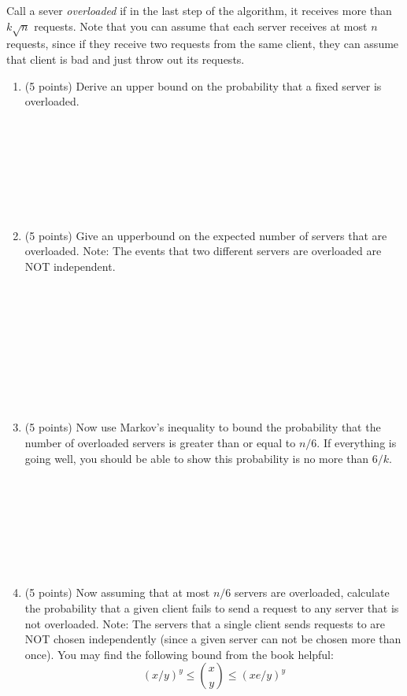 \documentclass[11pt]{article}
\begin{document}
\begin{enumerate}
Call a sever \emph{overloaded} if in the last step of the algorithm, it receives more than $k\sqrt{n}$ requests.  Note that you can assume that each server receives at most $n$ requests, since if they receive two requests from the same client, they can assume that client is bad and just throw out its requests.  
\begin{enumerate}

\item (5 points) Derive an upper bound on the probability that a fixed server is overloaded.
 \\ \ \\ \ \\ \ \\ \ \\ \ \\ \ \\ \ \\
  
\pagebreak 
  
\item (5 points) Give an upperbound on the expected number of servers that are overloaded.  Note: The events that two different servers are overloaded are NOT independent.

  \ \\ \ \\ \ \\ \ \\ \ \\ \ \\ \ \\ \ \\

\item (5 points) Now use Markov's inequality to bound the probability that the number of overloaded servers is greater than or equal to $n/6$.  If everything is going well, you should be able to show this probability is no more than $6/k$.
\ \\ \ \\ \ \\ \ \\ \ \\ \ \\ \ \\ \ \\


\pagebreak

\item (5 points) Now assuming that at most $n/6$ servers are overloaded, calculate the probability that a given client fails to send a request to any server that is not overloaded.  Note: The servers that a single client sends requests to are NOT chosen independently (since a given server can not be chosen more than once).  You may find the following bound from the book helpful: 
$$ (x/y)^{y} \leq {x \choose y} \leq (xe/y)^{y}$$


\end{enumerate}
\end{enumerate}
\end{document}
